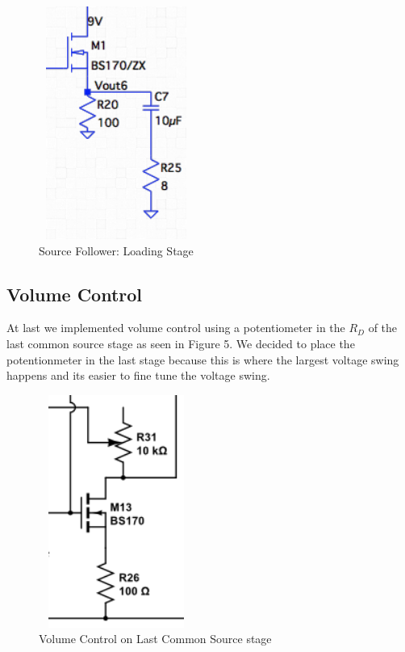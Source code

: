 \documentclass[11pt, twoside, letterpaper]{article}
\begin{document}
\begin{figure}[htbp]
\begin{center}
\includegraphics[width=2in,height=3in]{SourceFollower.png}
\caption{Source Follower: Loading Stage}
\end{center}
\end{figure}
\FloatBarrier

\subsection{Volume Control}
At last we implemented volume control using a potentiometer in the $R_D$ of the last common source stage as seen in Figure 5. We decided
to place the potentionmeter in the last stage because this is where the largest voltage swing happens and its easier to fine tune the 
voltage swing.

\begin{figure}[htbp]
\begin{center}
\includegraphics[width=2in,height=3in]{VolumeControl.png}
\caption{Volume Control on Last Common Source stage}
\end{center}
\end{figure}
\FloatBarrier
\end{document}
